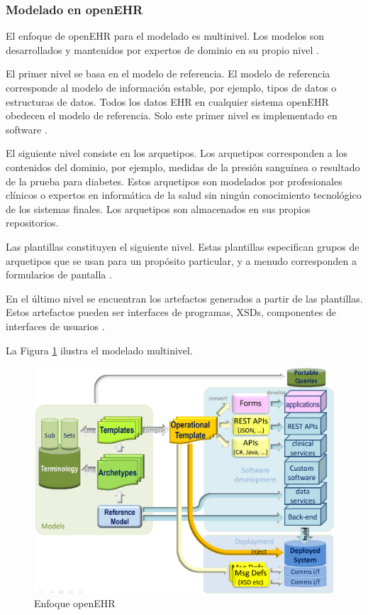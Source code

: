 \subsubsection{Modelado en openEHR}

El enfoque de openEHR para el modelado es multinivel. Los modelos son desarrollados y mantenidos por expertos de dominio en su propio nivel \cite{openEHRArchitecture}.

El primer nivel se basa en el modelo de referencia. El modelo de referencia corresponde al modelo de información estable, por ejemplo, tipos de datos o estructuras de datos. Todos los datos EHR en cualquier sistema openEHR obedecen el modelo de referencia. Solo este primer nivel es implementado en software \cite{openEHRArchitecture}.

El siguiente nivel consiste en los arquetipos. Los arquetipos corresponden a los contenidos del dominio, por ejemplo, medidas de la presión sanguínea o resultado de la prueba para diabetes. Estos arquetipos son modelados por profesionales clínicos o expertos en informática de la salud sin ningún conocimiento tecnológico de los sistemas finales. Los arquetipos son almacenados en sus propios repositorios.

Las plantillas constituyen el siguiente nivel. Estas plantillas especifican grupos de arquetipos que se usan para un propósito particular, y a menudo corresponden a formularios de pantalla \cite{openEHRArchitecture}.

En el último nivel se encuentran los artefactos generados a partir de las plantillas. Estos artefactos pueden ser interfaces de programas, XSDs, componentes de interfaces de usuarios \cite{openEHR}.

La Figura \ref{fig:openeEHR_ecosystem} ilustra el modelado multinivel.

\begin{figure}[h]
  \centering
  \includegraphics[scale=0.6]{./images/openehr_dev_ecosystem}
  \caption{Enfoque openEHR}
  \label{fig:openeEHR_ecosystem}
\end{figure}
